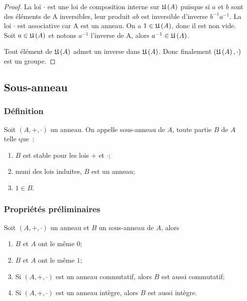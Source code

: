 \begin{proof}
  La loi \(\cdot\) est une loi de composition interne sur \(\mathfrak{U}\left(A\right)\) puisque si \(a\) et \(b\) sont des éléments de A inversibles, leur produit \(ab\) est inversible d'inverse \(b^{-1}a^{-1}\). La loi \(\cdot\) est associative car A est un anneau. On a \(1 \in \mathfrak{U}\left(A\right)\), donc il est non vide. Soit \(a \in \mathfrak{U}\left(A\right)\) et notons \(a^{-1}\) l'inverse de A, alors \(a^{-1} \in \mathfrak{U}\left(A\right)\).

Tout élément de \(\mathfrak{U}\left(A\right)\) admet un inverse dans \(\mathfrak{U}\left(A\right)\). Donc finalement \((\mathfrak{U}\left(A\right),\cdot)\) est un groupe.
\end{proof}

\subsection{Sous-anneau}

\subsubsection{Définition}

\begin{defdef}
  Soit \((A,+,\cdot)\) un anneau. On appelle sous-anneau de \(A\), toute partie \(B\) de \(A\) telle que~:
  \begin{enumerate}
  \item \(B\) est stable pour les lois \(+\) et \(\cdot\);
  \item muni des lois induites, \(B\) est un anneau;
  \item \(1 \in B\).
  \end{enumerate}
\end{defdef}

\subsubsection{Propriétés préliminaires}

Soit \((A,+,\cdot)\) un anneau et \(B\) un sous-anneau de \(A\), alors
\begin{enumerate}
\item \(B\) et \(A\) ont le même \(0\);
\item \(B\) et \(A\) ont le même \(1\);
\item Si \((A,+,\cdot)\) est un anneau commutatif, alors \(B\) est aussi commutatif;
\item Si \((A,+,\cdot)\) est un anneau intègre, alors \(B\) est aussi intègre.
\end{enumerate}

